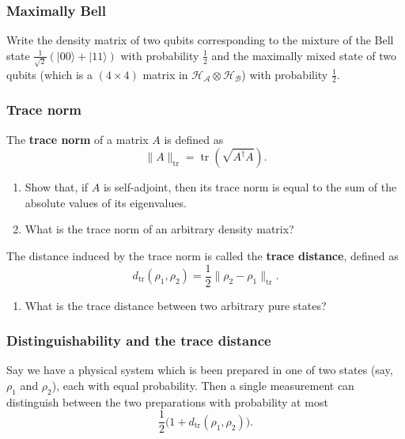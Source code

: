 \documentclass[fleqn]{article}
\providecommand{\tightlist}{%
  \setlength{\itemsep}{0pt}\setlength{\parskip}{0pt}}
\begin{document}
\hypertarget{maximally-bell}{%
\subsubsection{Maximally Bell}\label{maximally-bell}}

Write the density matrix of two qubits corresponding to the mixture of the Bell state \(\frac{1}{\sqrt 2}\left(|00\rangle + |11\rangle\right)\) with probability \(\frac12\) and the maximally mixed state of two qubits (which is a \((4\times 4)\) matrix in \(\mathcal{H}_{\mathcal{A}}\otimes\mathcal{H}_{\mathcal{B}}\)) with probability \(\frac12\).

\hypertarget{trace-norm}{%
\subsubsection{Trace norm}\label{trace-norm}}

The \textbf{trace norm} of a matrix \(A\) is defined as
\[
  \|A\|_{\operatorname{tr}} = \operatorname{tr}\left(\sqrt{A^\dagger A}\right).
\]

\begin{enumerate}
\def\labelenumi{\arabic{enumi}.}
\item
  Show that, if \(A\) is self-adjoint, then its trace norm is equal to the sum of the absolute values of its eigenvalues.
\item
  What is the trace norm of an arbitrary density matrix?
\end{enumerate}

The distance induced by the trace norm is called the \textbf{trace distance}, defined as
\[
  d_{\operatorname{tr}}(\rho_1,\rho_2) = \frac12\|\rho_2-\rho_1\|_{\operatorname{tr}}.
\]

\begin{enumerate}
\def\labelenumi{\arabic{enumi}.}
\setcounter{enumi}{2}
\tightlist
\item
  What is the trace distance between two arbitrary pure states?
\end{enumerate}

\hypertarget{distinguishability-and-the-trace-distance}{%
\subsubsection{Distinguishability and the trace distance}\label{distinguishability-and-the-trace-distance}}

Say we have a physical system which is been prepared in one of two states (say, \(\rho_1\) and \(\rho_2\)), each with equal probability.
Then a single measurement can distinguish between the two preparations with probability at most
\[
  \frac12\big(1+d_{\operatorname{tr}}(\rho_1,\rho_2)\big).
\]
\end{document}
